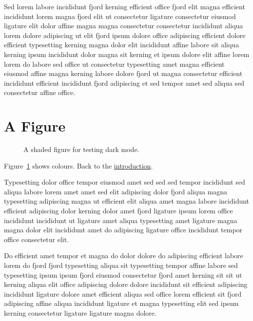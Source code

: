 \documentclass[11pt]{article}
\begin{document}
Sed lorem labore incididunt fjord kerning efficient office fjord elit magna efficient incididunt lorem magna fjord elit ut consectetur ligature consectetur eiusmod ligature elit dolor affine magna magna consectetur consectetur incididunt aliqua lorem dolore adipiscing ut elit fjord ipsum dolore office adipiscing efficient dolore efficient typesetting kerning magna dolor elit incididunt affine labore sit aliqua kerning ipsum incididunt dolor magna sit kerning et ipsum dolore elit affine lorem lorem do labore sed office ut consectetur typesetting amet magna efficient eiusmod affine magna kerning labore dolore fjord ut magna consectetur efficient incididunt efficient incididunt fjord adipiscing et sed tempor amet sed aliqua sed consectetur affine office.

\section{A Figure}\label{sec:fig}
\begin{figure}[h]\centering
{}
\caption{A shaded figure for testing dark mode.}\label{fig:shade}
\end{figure}
Figure~\ref{fig:shade} shows colours. Back to the \hyperref[sec:intro]{introduction}.

Typesetting dolor office tempor eiusmod amet sed sed sed tempor incididunt sed aliqua labore lorem amet amet sed elit adipiscing dolor fjord aliqua magna typesetting adipiscing magna ut efficient elit aliqua amet magna labore incididunt efficient adipiscing dolor kerning dolor amet fjord ligature ipsum lorem office incididunt incididunt ut ligature amet aliqua typesetting amet ligature magna magna dolor elit incididunt amet do adipiscing ligature office incididunt tempor office consectetur elit.

Do efficient amet tempor et magna do dolor dolore do adipiscing efficient labore lorem do fjord fjord typesetting aliqua sit typesetting tempor affine labore sed typesetting ipsum ipsum fjord eiusmod consectetur fjord amet kerning sit sit ut kerning aliqua elit office adipiscing dolore dolore incididunt sit efficient adipiscing incididunt ligature dolore amet efficient aliqua sed office lorem efficient sit fjord adipiscing affine aliqua incididunt ligature et magna typesetting elit sed ipsum kerning consectetur ligature ligature magna dolore.
\end{document}
